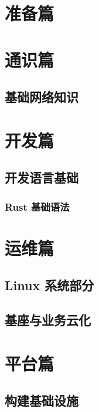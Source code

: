 \documentclass[UTF8,a4paper,openany]{ctexbook}
\begin{document}
  
  
  \frontmatter
  
  

  \pagestyle{tocstyle}      %
  \tableofcontents
  \pagestyle{fancy}     %

  \mainmatter

  \part{准备篇}
    

  \part{通识篇}
    \chapter{基础网络知识}

  \part{开发篇}
    \chapter{开发语言基础}
      \section{Rust 基础语法}

  \part{运维篇}
    \chapter{Linux 系统部分}
    \chapter{基座与业务云化}

  \part{平台篇}
    \chapter{构建基础设施}
\end{document}
